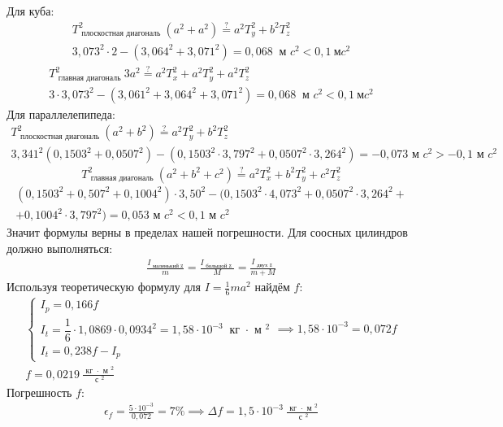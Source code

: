 Для куба: \begin{gather}
   T_ \text{ плоскостная диагональ }^2(a^2 + a^2) \overset{?}{=} a^2T_y^2 + b^2T_z^2 \\
   3,073^2 \cdot 2 - (3,064^2 + 3,071^2) = 0,068~\text{ м }c^2 < 0,1~\text{м}c^2
\end{gather} \begin{gather}
   T_\text{ главная диагональ }^2 3a^2 \overset{?}{=} a^2 T_x^2 + a^2 T_y^2 + a^2 T_z^2 \\
   3 \cdot 3,073^2 - (3,061^2 + 3,064^2 + 3,071^2) = 0,068~\text{ м }c^2 < 0,1~\text{м}c^2
\end{gather}
Для параллелепипеда: \begin{gather}
   T_ \text{ плоскостная диагональ }^2(a^2 + b^2) \overset{?}{=} a^2T_y^2 + b^2T_z^2 \\
   3,341^2(0,1503^2 + 0,0507^2) - (0,1503^2 \cdot 3,797^2 + 0,0507^2 \cdot 3,264^2) = - 0,073 \text{ м }c^2 >-0,1 \text{ м }c^2
\end{gather} \[
   T_\text{ главная диагональ }^2 (a^2 + b^2 + c^2) \overset{?}{=} a^2 T_x^2 + b^2 T_y^2 + c^2 T_z^2 \]
   \begin{multline}
   (0,1503^2 + 0,507^2 + 0,1004^2) \cdot 3,50^2 - (0,1503^2 \cdot 4,073^2 + 0,0507^2 \cdot 3,264^2 +\\+ 0,1004^2 \cdot 3,797^2) = 0,053 \text{ м }c^2 < 0,1 \text{ м }c^2
\end{multline}
Значит формулы верны в пределах нашей погрешности.
Для соосных цилиндров должно выполняться: \begin{gather}
   \frac{I_\text{ маленький z}}{m}  = \frac{I_\text{ большой z }}{M}  = \frac{I_\text{ двух z }}{m + M}
\end{gather}
Используя теоретическую формулу для $ I = \frac{1}{6}m a^2 $ найдём $ f $: \begin{gather}
   \begin{cases} 
      I_p = 0,166f \\
      I_t = \dfrac{1}{6} \cdot 1,0869 \cdot 0,0934^2 = 1,58 \cdot 10^{ - 3}~\text{ кг } \cdot \text{ м }^2 \\
      I_t = 0,238f - I_p
   \end{cases} \implies 1,58 \cdot 10^{ - 3} = 0,072f \\
   f = 0,0219~\frac{\text{ кг } \cdot \text{ м }^2}{\text{ с }^2}
\end{gather}
Погрешность $ f $: \begin{gather}
   \epsilon_f = \frac{5 \cdot 10^{ - 3}}{0,072} = 7 \% \implies \Delta f = 1,5 \cdot 10^{ - 3}~\frac{\text{ кг } \cdot \text{ м }^2}{\text{ с }^2}
\end{gather}
